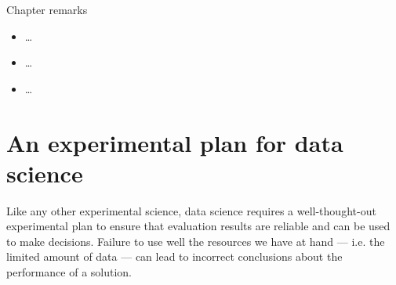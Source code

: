 \begin{mainbox}{Chapter remarks}


  \startcontents[chapters]
  \vspace{1em}


  \begin{itemize}
    \item \dots
  \end{itemize}


  \begin{itemize}
    \item \dots
  \end{itemize}


  \begin{itemize}
    \item \dots
  \end{itemize}
\end{mainbox}

{}
\clearpage



\section{An experimental plan for data science}

Like any other experimental science, data science requires a well-thought-out experimental
plan to ensure that evaluation results are reliable and can be used to make decisions.
Failure to use well the resources we have at hand --- i.e. the limited amount of data ---
can lead to incorrect conclusions about the performance of a solution.

